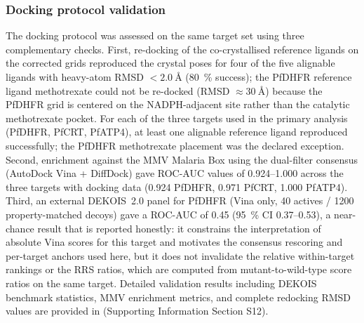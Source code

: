\documentclass[journal=jcisd8,manuscript=article]{achemso}
\begin{document}
\subsubsection{Docking protocol validation}
The docking protocol was assessed on the same target set using three complementary checks. First, re-docking of the co-crystallised reference ligands on the corrected grids reproduced the crystal poses for four of the five alignable ligands with heavy-atom RMSD $< \SI{2.0}{\angstrom}$ (\qty{80}{\percent} success); the PfDHFR reference ligand methotrexate could not be re-docked (RMSD $\approx \SI{30}{\angstrom}$) because the PfDHFR grid is centered on the NADPH-adjacent site rather than the catalytic methotrexate pocket. For each of the three targets used in the primary analysis (PfDHFR, PfCRT, PfATP4), at least one alignable reference ligand reproduced successfully; the PfDHFR methotrexate placement was the declared exception. Second, enrichment against the MMV Malaria Box using the dual-filter consensus (AutoDock Vina + DiffDock) gave ROC-AUC values of \numrange{0.924}{1.000} across the three targets with docking data (\num{0.924} PfDHFR, \num{0.971} PfCRT, \num{1.000} PfATP4). Third, an external DEKOIS~2.0 panel for PfDHFR (Vina only, \num{40} actives / \num{1200} property-matched decoys) gave a ROC-AUC of \num{0.45} (\qty{95}{\percent} CI \numrange{0.37}{0.53}), a near-chance result that is reported honestly: it constrains the interpretation of absolute Vina scores for this target and motivates the consensus rescoring and per-target anchors used here, but it does not invalidate the relative within-target rankings or the RRS ratios, which are computed from mutant-to-wild-type score ratios on the same target. Detailed validation results including DEKOIS benchmark statistics, MMV enrichment metrics, and complete redocking RMSD values are provided in  (Supporting Information Section S12).
\end{document}
